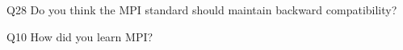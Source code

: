 \begin{description}%
\item{Q28} Do you think the MPI standard should maintain backward compatibility?%
\item{Q10} How did you learn MPI?%
\end{description}%
